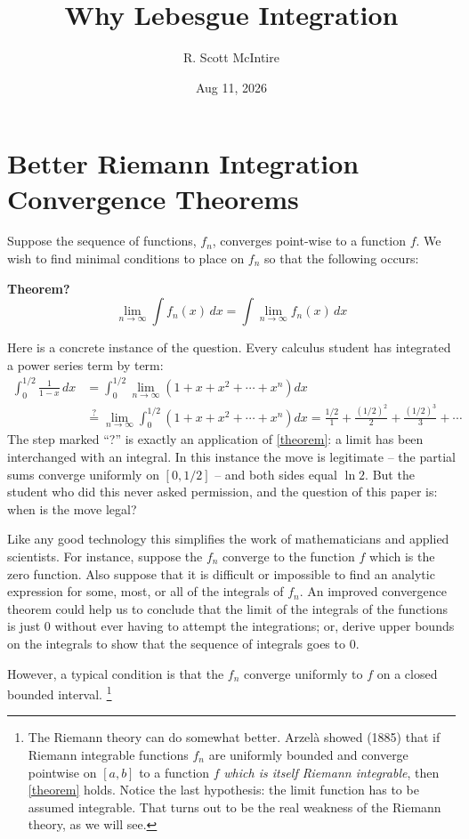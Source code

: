 \documentclass{article}
\title{Why Lebesgue Integration}
\author{R. Scott McIntire}
\date{Aug 11, 2026}
\begin{document}
\maketitle


\section{Better Riemann Integration Convergence Theorems}
Suppose the sequence of functions, $f_n$, converges point-wise to a function $f$.
We wish to find minimal conditions to place on $f_n$ so that the following occurs:

{\bf Theorem?}
\begin{equation}
	\lim_{n \to \infty} \int f_n(x) \, dx = \int \lim_{n \to \infty} f_n(x) \, dx \label{theorem}
\end{equation}

Here is a concrete instance of the question. Every calculus student has
integrated a power series term by term:
\begin{align*}
	\int_0^{1/2} \frac{1}{1-x}\, dx
		&= \int_0^{1/2} \lim_{n \to \infty} \left(1 + x + x^2 + \cdots + x^n\right) dx \\
		&\overset{?}{=} \lim_{n \to \infty} \int_0^{1/2} \left(1 + x + x^2 + \cdots + x^n\right) dx
		 = \frac{1/2}{1} + \frac{(1/2)^2}{2} + \frac{(1/2)^3}{3} + \cdots
\end{align*}
The step marked ``?'' is exactly an application of \eqref{theorem}: a limit
has been interchanged with an integral. In this instance the move is
legitimate -- the partial sums converge uniformly on $[0, 1/2]$ -- and both
sides equal $\ln 2$. But the student who did this never asked permission,
and the question of this paper is: when is the move legal?

Like any good technology this simplifies the work of mathematicians
and applied scientists. For instance, suppose the $f_n$ converge to the function $f$
which is the zero function. Also suppose that it is difficult or impossible to 
find an analytic expression for some, most, or all of the integrals of $f_n$. 
An improved convergence theorem could help us to conclude that the limit of the integrals of 
the functions is just $0$ without ever having to attempt the integrations; or, 
derive upper bounds on the integrals to show that 
the sequence of integrals goes to $0$.

However, a typical condition is that the $f_n$ converge
uniformly to $f$ on a closed bounded interval.%
\footnote{The Riemann theory can do somewhat better. Arzel\`a showed (1885)
that if Riemann integrable functions $f_n$ are uniformly bounded and converge
pointwise on $[a,b]$ to a function $f$ {\em which is itself Riemann
integrable\/}, then \eqref{theorem} holds. Notice the last hypothesis: the
limit function has to be assumed integrable. That turns out to be the real
weakness of the Riemann theory, as we will see.}
\end{document}
